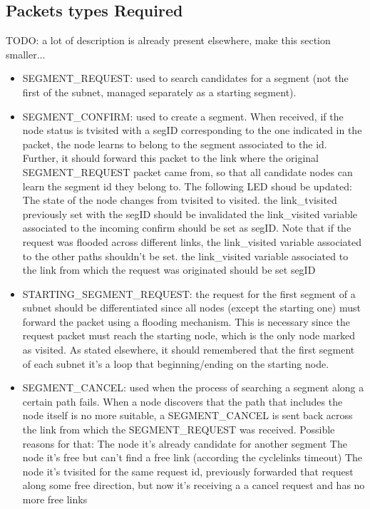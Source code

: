 \documentclass[final,journal,letterpaper]{IEEEtran}
\begin{document}
\subsection{Packets types Required}
TODO: a lot of description is already present elsewhere, make this
section smaller...

\begin{itemize}
\item{SEGMENT\_REQUEST}: used to search candidates for a segment (not the
first of the subnet, managed separately as a starting segment).

\item{SEGMENT\_CONFIRM}: used to create a segment. When received, if the node
status is tvisited with a segID corresponding to the one indicated in
the packet, the node learns to belong to the segment associated to the
id. Further, it should forward this packet to the link where the
original SEGMENT\_REQUEST packet came from, so that all candidate nodes
can learn the segment id they belong to. The following LED shoud be
updated: The state of the node changes from tvisited to visited.  the
link\_tvisited previously set with the segID should be invalidated the
link\_visited variable associated to the incoming confirm should be set
as segID. Note that if the request was flooded across different links,
the link\_visited variable associated to the other paths shouldn’t be
set.  the link\_visited variable associated to the link from which the
request was originated should be set segID

\item{STARTING\_SEGMENT\_REQUEST}: the request for the first segment of a
subnet should be differentiated since all nodes (except the starting
one) must forward the packet using a flooding mechanism. This is
necessary since the request packet must reach the starting node, which
is the only node marked as visited. As stated elsewhere, it should
remembered that the first segment of each subnet it's  a loop that
beginning/ending on the starting node.


\item{SEGMENT\_CANCEL}: used when the process of searching a segment along a
certain path fails. When a node discovers that the path that includes
the node itself is no more suitable, a SEGMENT\_CANCEL is sent back
across the link from which the SEGMENT\_REQUEST was received.  Possible
reasons for that: The node it’s already candidate for another segment
The node it’s free but can’t find a free link (according the
cyclelinks timeout) The node it’s tvisited for the same request id,
previously forwarded that request along some free direction, but now
it’s receiving a a cancel request and has no more free links

\end{itemize}
\end{document}
